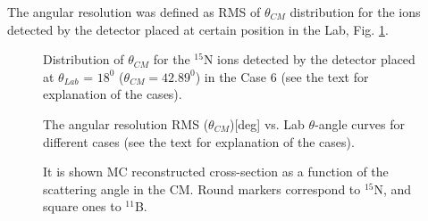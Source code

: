 \documentclass[%
 aip,
cp,  %
 amsmath,amssymb,%
 reprint,%
]{revtex4-2}
\begin{document}
The angular resolution was defined as RMS of  $\theta_{CM}$ distribution for the ions detected by the detector placed at certain position in the Lab, Fig. \ref{ris:fig2}.

\begin{figure}[h]
\caption{Distribution of $\theta_{CM}$ for the ${}^{15}$N ions detected by the detector placed at $\theta_{Lab}$ = $18^0$ ($\theta_{CM}=42.89^0$) in the Case 6 (see the text for explanation of the cases).}
\label{ris:fig2}
\end{figure}


\begin{figure}[h!]
\caption{The angular resolution RMS ($\theta_{CM}$)[deg] vs. Lab $\theta$-angle curves for different cases (see the text for explanation of the cases).}
\label{ris:fig3}
\end{figure}

\begin{figure}[h!]
\caption{It is shown MC reconstructed cross-section as a function of the scattering angle in the CM. Round markers correspond to ${}^{15}$N, and
square ones to ${}^{11}$B.}
\label{ris:fig4}
\end{figure}
\end{document}
